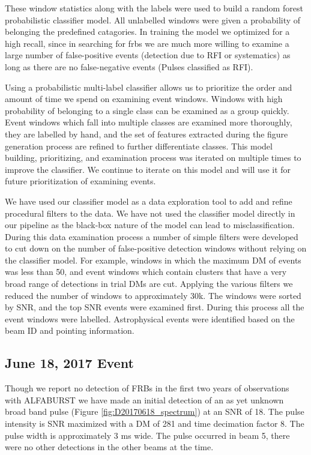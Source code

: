 \documentclass[a4paper,fleqn,usenatbib]{mnras}
\begin{document}
These window statistics along with the labels were used to build a random forest
probabilistic classifier model. All unlabelled windows were given a probability of
belonging the predefined catagories. In training the model we optimized for a
high recall, since in searching for \glspl{frb} we are much more willing to
examine a large number of false-positive events (detection due to RFI or
systematics) as long as there are no false-negative events (Pulses classified as
RFI). 

Using a probabilistic multi-label classifier allows us to prioritize the order and
amount of time we spend on examining event windows. Windows with high
probability of belonging to a single class can be examined as a group quickly.
Event windows which fall into multiple classes are examined more thoroughly,
they are labelled by hand, and the set of features extracted during the figure
generation process are refined to further differentiate classes. This
model building, prioritizing, and examination process was iterated on multiple
times to improve the classifier. We continue to iterate on this model and will
use it for future prioritization of examining events.

We have used our classifier model as a data exploration tool to add and refine
procedural filters to the data. We have not used the classifier model directly
in our pipeline as the black-box nature of the model can lead to
misclassification.  During this data examination process a number of simple
filters were developed to cut down on the number of false-positive detection
windows without relying on the classifier model. For example, windows in which
the maximum DM of events was less than 50, and event windows which contain
clusters that have a very broad range of detections in trial DMs are cut.
Applying the various filters we reduced the number of windows to approximately
30k. The windows were sorted by SNR, and the top SNR events were examined first.
During this process all the event windows were labelled. Astrophysical events
were identified based on the beam ID and pointing information.


\subsection{June 18, 2017 Event}
\label{sec:18062017}

Though we report no detection of FRBs in the first two years of observations
with ALFABURST we have made an initial detection of an as yet unknown broad band
pulse (Figure \ref{fig:D20170618_spectrum}) at an SNR of 18. The pulse intensity
is SNR maximized with a DM of 281 and time decimation factor 8. The pulse width
is approximately 3 ms wide. The pulse occurred in beam 5, there were no other
detections in the other beams at the time.
\end{document}
